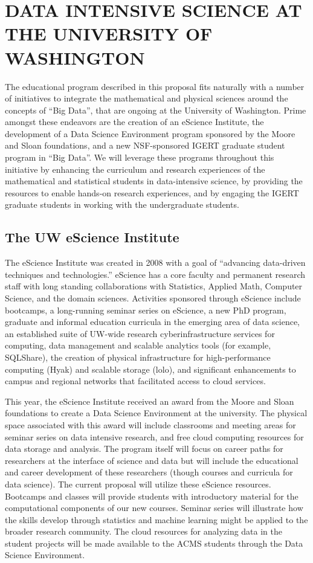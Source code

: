 \section{DATA INTENSIVE SCIENCE AT THE UNIVERSITY OF WASHINGTON}
The educational program described in this proposal fits naturally with a number of initiatives to integrate the mathematical and physical sciences around the concepts of ``Big Data'', that are ongoing at the University of Washington. Prime amongst these endeavors are the creation of an eScience Institute, the development of a Data Science Environment program sponsored by the Moore and Sloan foundations, and a new NSF-sponsored IGERT graduate student program in ``Big Data''. We will leverage these programs throughout this initiative by enhancing the curriculum and research experiences of the mathematical and statistical students in data-intensive science, by providing the resources to enable hands-on research experiences, and by engaging the IGERT graduate students in working with the undergraduate students.

\subsection{The UW eScience Institute}

The eScience Institute was created in 2008 with a goal of “advancing data-driven techniques and technologies.” eScience has a core faculty and permanent research staff with long standing collaborations with Statistics, Applied Math, Computer Science, and the domain sciences. Activities sponsored through eScience include bootcamps, a long-running seminar series on eScience, a new PhD program, graduate and informal education curricula in the emerging area of data science, an established suite of UW-wide research cyberinfrastructure services for computing, data management and scalable analytics tools (for example, SQLShare), the creation of physical infrastructure for high-performance computing (Hyak) and scalable storage (lolo), and significant enhancements to campus and regional networks that facilitated access to cloud services.

This year, the eScience Institute received an award from the Moore and Sloan foundations to create a Data Science Environment at the university. The physical space associated with this award will include classrooms and meeting areas for seminar series on data intensive research, and free cloud computing resources for data storage and analysis. The program itself will focus on career paths for researchers at the interface of science and data but will include the educational and career development of these researchers (though courses and curricula for data science). The current proposal will utilize these eScience resources.
 Bootcamps and classes will provide students with introductory material for the computational components of our new courses. Seminar series will illustrate how the skills develop through statistics and machine learning might be applied to the broader research community. The cloud resources for analyzing data in the student projects will be made available to the ACMS students through the Data Science Environment.

